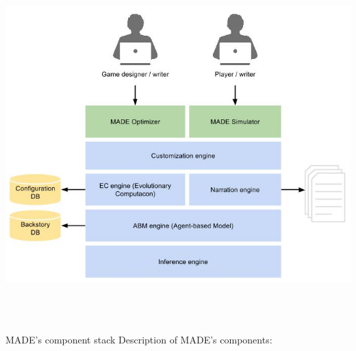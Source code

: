 \documentclass[a4paper]{article}
\begin{document}
\href{http://www.velonuboso.com/made/blog/wp-content/uploads/2015/06/MADEs-architecture-2.jpg}{
\includegraphics[width=16.955cm,height=13.598cm]{makingofmade113-img9.jpg}
}

MADE{\textquoteright}s component stack
Description of MADE{\textquoteright}s components:
\end{document}
